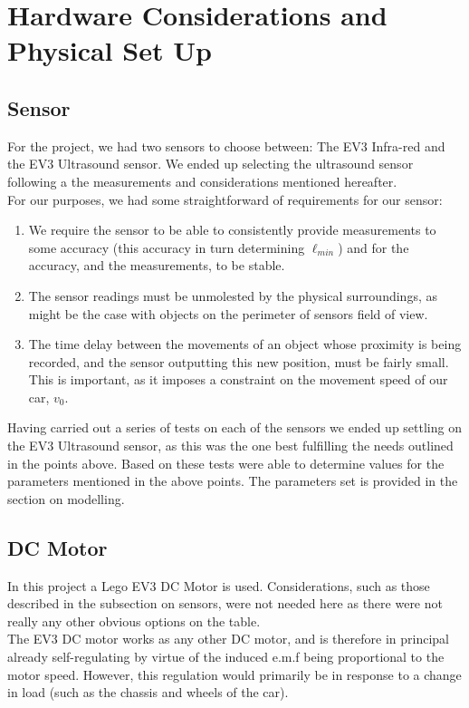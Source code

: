 \documentclass[a4paper,onecolumn,amsmath,amssymb]{revtex4-1}
\begin{document}
\section{\textbf{ Hardware Considerations and Physical Set Up }}
\subsection{\textbf{Sensor}}
For the project, we had two sensors to choose between: The EV3 Infra-red and the EV3 Ultrasound sensor. We ended up selecting the ultrasound sensor following a the measurements and considerations mentioned hereafter.\\
For our purposes, we had some straightforward of requirements for our sensor:
\begin{enumerate}
\item We require the sensor to be able to consistently provide measurements to some accuracy (this accuracy in turn determining $\ell_{min}$) and for the accuracy, and the measurements, to be stable.
\item The sensor readings must be unmolested by the physical surroundings, as might be the case with objects on the perimeter of sensors field of view.
\item The time delay between the movements of an object whose proximity is being recorded, and the sensor outputting this new position, must be fairly small. This is important, as it imposes a constraint on the movement speed of our car, $v_0$.
\end{enumerate}

Having carried out a series of tests on each of the sensors we ended up settling on the EV3 Ultrasound sensor, as this was the one best fulfilling the needs outlined in the points above. Based on these tests were able to determine values for the parameters mentioned in the above points. The parameters set is provided in the section on modelling.
\subsection{\textbf{DC Motor}}
In this project a Lego EV3 DC Motor is used. Considerations, such as those described in the subsection on sensors, were not needed here as there were not really any other obvious options on the table.\\

The EV3 DC motor works as any other DC motor, and is therefore in principal already self-regulating by virtue of the induced e.m.f being proportional to the motor speed. However, this regulation would primarily be in response to a change in load (such as the chassis and wheels of the car).
\end{document}
